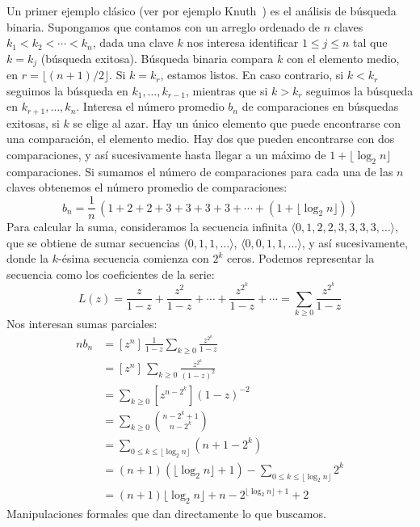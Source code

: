   Un primer ejemplo clásico
  (ver por ejemplo Knuth~\cite{knuth98:_sortin_searc})
  es el análisis de búsqueda binaria.%
  Supongamos que contamos con un arreglo ordenado de \(n\) claves
  \(k_1 < k_2 < \dotsb < k_n\),
  dada una clave \(k\) nos interesa identificar \(1 \le j \le n\)
  tal que \(k = k_j\)
  (búsqueda exitosa).
  Búsqueda binaria compara \(k\) con el elemento medio,
  en \(r = \lfloor (n + 1) / 2 \rfloor\).
  Si \(k = k_r\),
  estamos listos.
  En caso contrario,
  si \(k < k_r\) seguimos la búsqueda en \(k_1, \dotsc, k_{r - 1}\),
  mientras que si \(k > k_r\)
  seguimos la búsqueda en \(k_{r + 1}, \dotsc, k_n\).
  Interesa
  el número promedio \(b_n\) de comparaciones en búsquedas exitosas,
  si \(k\) se elige al azar.
  Hay un único elemento que puede encontrarse con una comparación,
  el elemento medio.
  Hay dos que pueden encontrarse con dos comparaciones,
  y así sucesivamente
  hasta llegar a un máximo
  de \(1 + \lfloor \log_2 n \rfloor\) comparaciones.
  Si sumamos el número de comparaciones
  para cada una de las \(n\) claves
  obtenemos el número promedio de comparaciones:
  \begin{equation*}
    b_n
      = \frac{1}{n} \,
	  \left(
	    1 + 2 + 2 + 3 + 3 + 3 + 3
	      + \dotsb
	      + (1 + \lfloor \log_2 n \rfloor)
	  \right)
  \end{equation*}
  Para calcular la suma,
  consideramos la secuencia infinita
    \(\langle 0, 1, 2, 2, 3, 3, 3, 3, \dotsc\rangle\),
  que se obtiene de sumar secuencias
  \(\langle 0, 1, 1, \dotsc \rangle\),
  \(\langle 0, 0, 1, 1, \dotsc \rangle\),
  y así sucesivamente,
  donde la \(k\)\nobreakdash-ésima secuencia
  comienza con \(2^k\) ceros.
  Podemos representar la secuencia
  como los coeficientes de la serie:
  \begin{equation*}
    L(z)
      = \frac{z}{1 - z}
	  + \frac{z^2}{1 - z}
	  + \dotsb
	  + \frac{z^{2^k}}{1 - z}
	  + \dotsb
      = \sum_{k \ge 0} \frac{z^{2^k}}{1 - z}
  \end{equation*}
  Nos interesan sumas parciales:
  \begin{align*}
    n b_n
      &= \left[ z^n \right] \,
	   \frac{1}{1 - z} \sum_{k \ge 0} \frac{z^{2^k}}{1 - z} \\
      &= \left[ z^n \right] \,
	   \sum_{k \ge 0} \frac{z^{2^k}}{(1 - z)^2} \\
      &= \sum_{k \ge 0} \left[ z^{n - 2^k} \right] (1 - z)^{-2} \\
      &= \sum_{k \ge 0} \binom{n - 2^k + 1}{n - 2^k} \\
      &= \sum_{0 \le k \le \lfloor \log_2 n \rfloor}
	   (n + 1 - 2^k) \\
      &= (n + 1) (\lfloor \log_2 n \rfloor + 1)
	   - \sum_{0 \le k \le \lfloor \log_2 n \rfloor} 2^k \\
      &= (n + 1) \lfloor \log_2 n \rfloor
	   + n - 2^{\lfloor \log_2 n \rfloor + 1} + 2
  \end{align*}
  Manipulaciones formales que dan directamente lo que buscamos.

